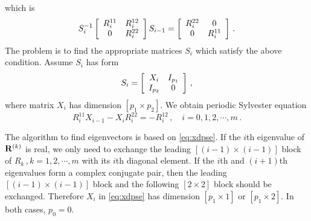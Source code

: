 which is
\[
  S^{-1}_{i}
  \left[
    \begin{array}{c c}
      R^{11}_{i} & R^{12}_{i} \\
      0 & R^{22}_{i}
    \end{array}
  \right]
  S_{i-1}=
  \left[
    \begin{array}{c c}
      R^{22}_{i} & 0 \\
      0 & R^{11}_{i}
    \end{array}
  \right]
  \,.
\]
The problem is to find the appropriate matrices $S_{i}$ which satisfy
the above condition. Assume $S_{i}$ has form
\[
  S_{i}=
  \left[
    \begin{array}{c c}
      X_{i} & I_{p_{1}} \\
      I_{p_{2}} & 0
    \end{array}
  \right]
  \,,
\]
where matrix $X_{i}$ has dimension $[p_{1}\!\times\! p_{2}]$. We obtain
periodic Sylvester equation
\begin{equation}
  \label{eq:xdpse}
  R^{11}_{i}X_{i-1}-X_{i}R^{22}_{i}=-R^{12}_{i}
  \,,\quad i=0,1,2,\cdots,m
  \,.
\end{equation}

The algorithm to find eigenvectors is based on \eqref{eq:xdpse}. If the
$i$th eigenvalue of $\mathbf{R}^{(k)}$ is real, we only need to exchange the
{leading} $[(i-1)\!\times\! (i-1)]$ block of $R_{k}\,,k=1,2,\cdots,m$ with
its $i$th diagonal element. If the $i$th and $(i+1)$th
eigenvalues form a complex conjugate pair,
then the {leading} $[(i-1)\!\times\! (i-1)]$
block and the following $[2\!\times\! 2]$ block should be exchanged.
Therefore $X_{i}$ in \eqref{eq:xdpse} has dimension $[p_{1}\!\times\! 1]$
or $[p_{1}\!\times\! 2]$. In both cases, $p_{0}=0$.


